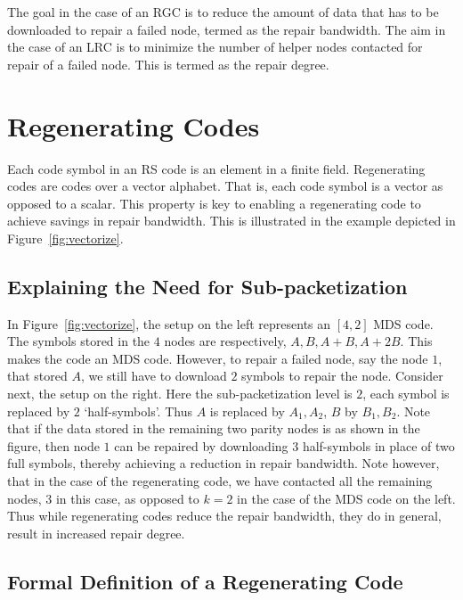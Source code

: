  \begin{multicols}{2}
	The goal in the case of an RGC is to reduce the amount of data that has to be downloaded to repair a failed node, termed as the repair bandwidth.    The aim in the case of an LRC is to minimize the number of helper nodes contacted for repair of a failed node.  This is termed as the repair degree. 
	
	\section{Regenerating Codes} 
	
	Each code symbol in an RS code is an element in a finite field.   Regenerating codes are codes over a vector alphabet.  That is, each code symbol is a vector as opposed to a scalar.  This property is key to enabling a regenerating code to achieve savings in repair bandwidth.  This is illustrated in the example depicted in Figure~\ref{fig:vectorize}. 
	
	\subsection{Explaining the Need for Sub-packetization}

	In Figure~\ref{fig:vectorize}, the setup on the left represents an $[4,2]$ MDS code.  The symbols stored in the $4$ nodes are respectively, $A,B,A+B,A+2B$.  This makes the code an MDS code.  However, to repair a failed node, say the node $1$, that stored $A$, we still have to download $2$ symbols to repair the node.  Consider next, the setup on the right.  Here the sub-packetization level is $2$, each symbol is replaced by $2$ `half-symbols'.  Thus $A$ is replaced by $A_1,A_2$, $B$ by $B_1,B_2$.  Note that if the data stored in the remaining two parity nodes is as shown in the figure, then node $1$ can be repaired by downloading $3$ half-symbols in place of two full symbols, thereby achieving a reduction in repair bandwidth. Note however, that in the case of the regenerating code, we have contacted all the remaining nodes, $3$ in this case, as opposed to $k=2$ in the case of the MDS code on the left. Thus while regenerating codes reduce the repair bandwidth, they do in general, result in increased repair degree. 

	\subsection{Formal Definition of a Regenerating Code} 
	

\end{multicols}
